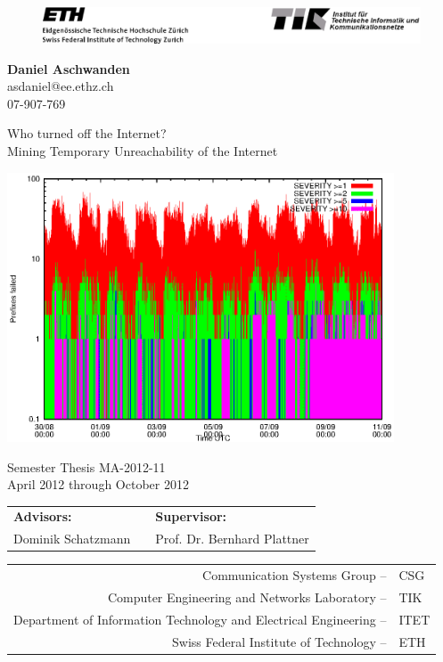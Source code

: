 \begin{titlepage}

  \begin{center}
  \begin{figure}[!t]
  \includegraphics[width=\textwidth]{images/TIKETHhdr.eps}
  \end{figure}
  \end{center}

	\vspace{2mm}
  \textbf{Daniel Aschwanden}\\
  asdaniel@ee.ethz.ch\\
  07-907-769
  \vspace{2mm}

  {\Huge \begin{flushleft}
        Who turned off the Internet?\\
		\Large Mining Temporary Unreachability of the Internet
        \end{flushleft}
 }
\vspace{3mm}
\centering
	\includegraphics[height=8cm]{images/prefix_failed_ipv4.eps}

\vspace{3mm}

Semester Thesis MA-2012-11\\
April 2012 through October 2012\\

\vspace{5mm}

\begin{tabular}{l p{} l}
\textbf{Advisors:} && \textbf{Supervisor:} \\
Dominik Schatzmann && Prof. Dr. Bernhard Plattner\\
\end{tabular}

\vspace{5mm}
\raggedleft
\begin{tabular}{rl}
Communication Systems Group --& CSG\\
Computer Engineering and Networks Laboratory --&TIK\\
Department of Information Technology and Electrical Engineering --& ITET\\
Swiss Federal Institute of Technology -- & ETH\\
\end{tabular}


\end{titlepage}
